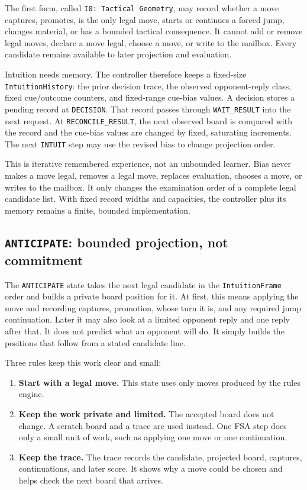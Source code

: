 \documentclass[11pt]{article}
\begin{document}
The first form, called \texttt{I0: Tactical Geometry}, may record whether a
move captures, promotes, is the only legal move, starts or continues a forced
jump, changes material, or has a bounded tactical consequence. It cannot add
or remove legal moves, declare a move legal, choose a move, or write to the
mailbox. Every candidate remains available to later projection and evaluation.

Intuition needs memory. The controller therefore keeps a fixed-size
\texttt{IntuitionHistory}: the prior decision trace, the observed
opponent-reply class, fixed cue/outcome counters, and fixed-range cue-bias
values. A decision stores a pending record at \texttt{DECISION}. That record
passes through \texttt{WAIT\_RESULT} into the next request. At
\texttt{RECONCILE\_RESULT}, the next observed board is compared with the
record and the cue-bias values are changed by fixed, saturating increments.
The next \texttt{INTUIT} step may use the revised bias to change projection
order.

This is iterative remembered experience, not an unbounded learner. Bias never
makes a move legal, removes a legal move, replaces evaluation, chooses a move,
or writes to the mailbox. It only changes the examination order of a complete
legal candidate list. With fixed record widths and capacities, the controller
plus its memory remains a finite, bounded implementation.

\subsection{\texttt{ANTICIPATE}: bounded projection, not commitment}

The \texttt{ANTICIPATE} state takes the next legal candidate in the
\texttt{IntuitionFrame} order and builds a private board position for it. At
first, this means applying the move and recording captures, promotion, whose
turn it is, and any required jump continuation.
Later it may also look at a limited opponent reply and one reply after that.
It does not predict what an opponent will do. It simply builds the positions
that follow from a stated candidate line.

Three rules keep this work clear and small:
\begin{enumerate}
  \item \textbf{Start with a legal move.} This state uses only moves produced
  by the rules engine.
  \item \textbf{Keep the work private and limited.} The accepted board does
  not change. A scratch board and a trace are used instead. One FSA step does
  only a small unit of work, such as applying one move or one continuation.
  \item \textbf{Keep the trace.} The trace records the candidate, projected
  board, captures, continuations, and later score. It shows why a move could
  be chosen and helps check the next board that arrives.
\end{enumerate}
\end{document}
